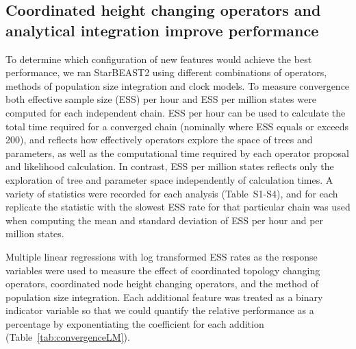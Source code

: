 \documentclass[nogrid]{MBE}%
\begin{document}
\subsection{Coordinated height changing operators and analytical integration improve performance}

To determine which configuration of new features would achieve the best
performance, we ran StarBEAST2 using different combinations of operators,
methods of population size integration and clock models. To measure
convergence both effective sample size (ESS) per hour and ESS per million
states were computed for each independent chain. ESS per hour can be used to
calculate the total time required for a converged chain (nominally where ESS
equals or exceeds 200), and reflects how effectively operators explore the
space of trees and parameters, as well as the computational time required by
each operator proposal and likelihood calculation. In contrast, ESS per
million states reflects only the exploration of tree and parameter space
independently of calculation times. A variety of statistics were recorded for
each analysis (Table~S1-S4), and for each replicate the statistic with the
slowest ESS rate for that particular chain was used when computing the mean
and standard deviation of ESS per hour and per million states.

Multiple linear regressions with log transformed ESS rates as the response
variables were used to measure the effect of coordinated topology changing
operators, coordinated node height changing operators, and the method of
population size integration. Each additional feature was treated as a binary
indicator variable so that we could quantify the relative performance as a
percentage by exponentiating the coefficient for each addition
(Table~\ref{tab:convergenceLM}).
\end{document}
